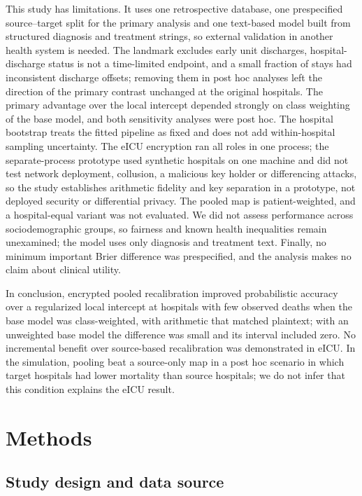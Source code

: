 \documentclass[11pt]{article}
\begin{document}
This study has limitations. It uses one retrospective database, one prespecified source--target split for the primary analysis and one text-based model built from structured diagnosis and treatment strings, so external validation in another health system is needed. The landmark excludes early unit discharges, hospital-discharge status is not a time-limited endpoint, and a small fraction of stays had inconsistent discharge offsets; removing them in post hoc analyses left the direction of the primary contrast unchanged at the original hospitals. The primary advantage over the local intercept depended strongly on class weighting of the base model, and both sensitivity analyses were post hoc. The hospital bootstrap treats the fitted pipeline as fixed and does not add within-hospital sampling uncertainty. The eICU encryption ran all roles in one process; the separate-process prototype used synthetic hospitals on one machine and did not test network deployment, collusion, a malicious key holder or differencing attacks, so the study establishes arithmetic fidelity and key separation in a prototype, not deployed security or differential privacy. The pooled map is patient-weighted, and a hospital-equal variant was not evaluated. We did not assess performance across sociodemographic groups, so fairness and known health inequalities remain unexamined; the model uses only diagnosis and treatment text. Finally, no minimum important Brier difference was prespecified, and the analysis makes no claim about clinical utility.

In conclusion, encrypted pooled recalibration improved probabilistic accuracy over a regularized local intercept at hospitals with few observed deaths when the base model was class-weighted, with arithmetic that matched plaintext; with an unweighted base model the difference was small and its interval included zero. No incremental benefit over source-based recalibration was demonstrated in eICU. In the simulation, pooling beat a source-only map in a post hoc scenario in which target hospitals had lower mortality than source hospitals; we do not infer that this condition explains the eICU result.

\section*{Methods}
\subsection*{Study design and data source}\label{study-design-and-data-source}
\end{document}
